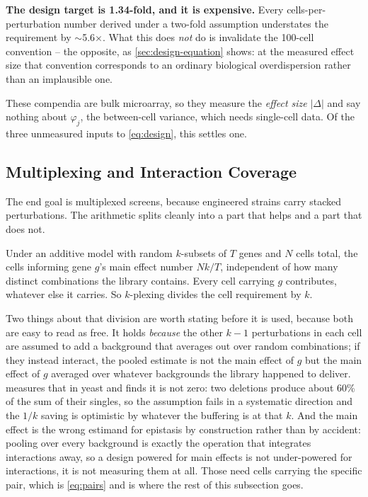 \begin{keybox}
\textbf{The design target is 1.34-fold, and it is expensive.} Every
cells-per-perturbation number derived under a two-fold assumption understates the
requirement by $\sim$5.6$\times$. What this does \emph{not} do is invalidate the
100-cell convention -- the opposite, as \cref{sec:design-equation} shows: at the
measured effect size that convention corresponds to an ordinary biological
overdispersion rather than an implausible one.
\end{keybox}

 These compendia are bulk microarray, so they
measure the \emph{effect size} $|\Delta|$ and say nothing about $\varphi_j$, the
between-cell variance, which needs single-cell data. Of the three unmeasured
inputs to \cref{eq:design}, this settles one.

\subsection{Multiplexing and Interaction Coverage}
\label{sec:multiplex}

The end goal is multiplexed screens, because engineered strains carry stacked
perturbations. The arithmetic splits cleanly into a part that helps and a part
that does not.

 Under an additive model with random $k$-subsets of $T$ genes and $N$ cells
total, the cells informing gene $g$'s main effect number $Nk/T$, independent of
how many distinct combinations the library contains. Every cell carrying $g$
contributes, whatever else it carries. So $k$-plexing divides the cell
requirement by $k$.

Two things about that division are worth stating before it is used, because both
are easy to read as free. It holds \emph{because} the other $k-1$ perturbations
in each cell are assumed to add a background that averages out over random
combinations; if they instead interact, the pooled estimate is not the main
effect of $g$ but the main effect of $g$ averaged over whatever backgrounds the
library happened to deliver.  measures that in yeast and
finds it is not zero: two deletions produce about 60\% of the sum of their
singles, so the assumption fails in a systematic direction and the $1/k$ saving
is optimistic by whatever the buffering is at that $k$. And the main effect is
the wrong estimand for epistasis by construction rather than by accident: pooling
over every background is exactly the operation that integrates interactions away,
so a design powered for main effects is not under-powered for interactions, it is
not measuring them at all. Those need cells carrying the specific pair, which is
\cref{eq:pairs} and is where the rest of this subsection goes.

